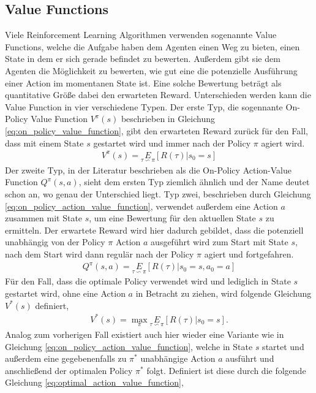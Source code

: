 \documentclass[]{iat}
\begin{document}
\subsection{Value Functions}
Viele Reinforcement Learning Algorithmen verwenden sogenannte Value Functions, welche die Aufgabe haben dem Agenten einen Weg zu bieten, einen State in dem er sich gerade befindet zu bewerten. Außerdem gibt sie dem Agenten die Möglichkeit zu bewerten, wie gut eine die potenzielle Ausführung einer Action im momentanen State ist. Eine solche Bewertung beträgt als quantitative Größe dabei den erwarteten Reward. Unterschieden werden kann die Value Function in vier verschiedene Typen. Der erste Typ, die sogennante On-Policy Value Function $V^{\pi}(s)$ beschrieben in Gleichung \ref{eq:on_policy_value_function}, gibt den erwarteten Reward zurück für den Fall, dass mit einem State $s$ gestartet wird und immer nach der Policy $\pi$ agiert wird.
\begin{align}
    V^{\pi}(s) = \underset{\tau \backsim \pi}{E}\left[R(\tau)|s_0 = s\right] \label{eq:on_policy_value_function}
\end{align}
Der zweite Typ, in der Literatur beschrieben als die On-Policy Action-Value Function $Q^{\pi}(s,a)$, sieht dem ersten Typ ziemlich ähnlich und der Name deutet schon an, wo genau der Unterschied liegt. Typ zwei, beschrieben durch Gleichung \ref{eq:on_policy_action_value_function}, verwendet außerdem eine Action $a$ zusammen mit State $s$, um eine Bewertung für den aktuellen State $s$ zu ermitteln. Der erwartete Reward wird hier dadurch gebildet, dass die potenziell unabhängig von der Policy $\pi$ Action $a$ ausgeführt wird zum Start mit State $s$, nach dem Start wird dann regulär nach der Policy $\pi$ agiert und fortgefahren.
\begin{align}
    Q^{\pi}(s,a) = \underset{\tau \backsim \pi}{E}\left[R(\tau)|s_0 = s, a_0 = a\right] \label{eq:on_policy_action_value_function}
\end{align}
Für den Fall, dass die optimale Policy verwendet wird und lediglich in State $s$ gestartet wird, ohne eine Action $a$ in Betracht zu ziehen, wird folgende Gleichung $V^*(s)$ definiert,
\begin{align}
    V^{*}(s) = \underset{\pi}{\max}\underset{\tau \backsim \pi}{E}\left[R(\tau)|s_0 = s\right]. \label{eq:optimal_value_function}
\end{align}
Analog zum vorherigen Fall existiert auch hier wieder eine Variante wie in Gleichung \ref{eq:on_policy_action_value_function}, welche in State $s$ startet und außerdem eine gegebenenfalls zu $\pi^*$ unabhängige Action $a$ ausführt und anschließend der optimalen Policy $\pi^*$ folgt. Definiert ist diese durch die folgende Gleichung \ref{eq:optimal_action_value_function},
\end{document}
